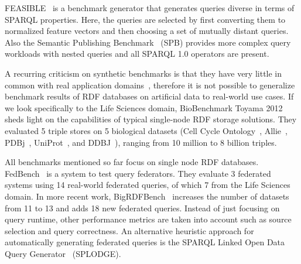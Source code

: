 FEASIBLE~\cite{saleem2015feasible} is a benchmark generator that generates queries diverse in terms of SPARQL properties. Here, the queries are selected by first converting them to normalized feature vectors and then choosing a set of mutually distant queries. Also the Semantic Publishing Benchmark~\cite{kotsevbenchmarking} (SPB) provides more complex query workloads with nested queries and all SPARQL 1.0 operators are present.

A recurring criticism on synthetic benchmarks is that they have very little in common with real application domains~\cite{DBLP:conf/sigmod/DuanKSU11},
therefore it is not possible to generalize benchmark results of RDF databases on artificial data to real-world use cases.
If we look specifically to the Life Sciences domain, BioBenchmark Toyama 2012~\cite{wu2014biobenchmark} sheds light on the capabilities of typical single-node RDF storage solutions. They evaluated 5 triple stores on 5 biological datasets (Cell Cycle Ontology~\cite{antezana2009cell}, Allie~\cite{yamamoto2011allie}, PDBj~\cite{kinjo2011protein}, UniProt~\cite{uniprot2014uniprot}, and DDBJ~\cite{tateno2002dna}), ranging from 10 million to 8 billion triples.

All benchmarks mentioned so far focus on single node RDF databases. FedBench~\cite{Schmidt2011} is a system to test query federators. They evaluate 3 federated systems using 14 real-world federated queries, of which 7 from the Life Sciences domain. In more recent work, BigRDFBench~\cite{Saleem} increases the number of datasets from 11 to 13 and adds 18 new federated queries. Instead of just focusing on query runtime, other performance metrics are taken into account such as source selection and query correctness. An alternative heuristic approach for automatically generating federated queries is the SPARQL Linked Open Data Query Generator~\cite{gorlitz2012splodge} (SPLODGE).

